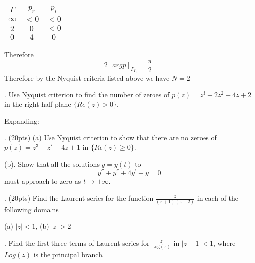 \documentclass[letterpaper, reqno,11pt]{article}
\begin{document}
\begin{table}[htpb]
    \centering
    \label{tab:q4}
    \begin{tabular}{c|c|c}
        $\Gamma$&$p_r$&$p_i$\\
        \hline
        $\infty$&$<0$&$<0$\\
        $2$ &$0$& $<0$\\
        $0$&$4$& $0$
    \end{tabular}
\end{table}
Therefore 
\[
2[arg p]_{\Gamma_{I_+}}=\frac{\pi}{2}
.\]
Therefore by the Nyquist criteria listed above we have $N=2$


\medskip

. Use Nyquist criterion to find the number of zeroes of $ p(z)= z^3+2z^2+4z +2$ in the right half plane $ \{ Re(z)>0\}$.

Expanding: 


\medskip

. (20pts)  (a) Use Nyquist criterion to show that there are no zeroes of $ p(z)= z^3+z^2+4z+1$ in  $\{ Re(z) \geq 0\}$.

(b). Show that all  the solutions $ y= y(t)$ to
$$ y^{'''}+ y^{''} + 4 y^{'} +y=0$$
must approach to zero as $ t\to +\infty$.



\medskip

. (20pts) Find the Laurent series for the function $ \frac{z}{ (z+1)(z-2)}$ in each of the following domains

(a) $ |z|<1$,  (b) $ |z|>2$

\medskip

. Find the first three terms of Laurent series for $\frac{z}{ \mbox{Log} (z)}$   in $|z-1| <1$, where $ Log (z)$ is the principal branch.

 
\end{document}
